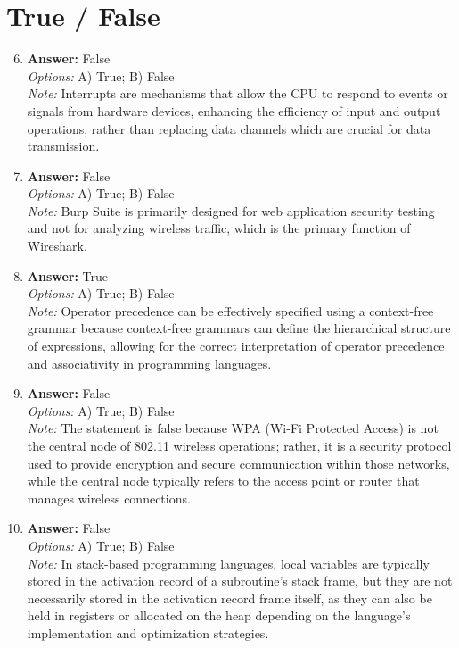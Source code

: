 \documentclass[12pt]{article}
\begin{document}
\section*{True / False}
\begin{enumerate}[label=\arabic*.]
\setcounter{enumi}{5}
\item \textbf{Answer:} False
\\ \textit{Options:} A) True; B) False
\\ \textit{Note:} Interrupts are mechanisms that allow the CPU to respond to events or signals from hardware devices, enhancing the efficiency of input and output operations, rather than replacing data channels which are crucial for data transmission.
\item \textbf{Answer:} False
\\ \textit{Options:} A) True; B) False
\\ \textit{Note:} Burp Suite is primarily designed for web application security testing and not for analyzing wireless traffic, which is the primary function of Wireshark.
\item \textbf{Answer:} True
\\ \textit{Options:} A) True; B) False
\\ \textit{Note:} Operator precedence can be effectively specified using a context-free grammar because context-free grammars can define the hierarchical structure of expressions, allowing for the correct interpretation of operator precedence and associativity in programming languages.
\item \textbf{Answer:} False
\\ \textit{Options:} A) True; B) False
\\ \textit{Note:} The statement is false because WPA (Wi-Fi Protected Access) is not the central node of 802.11 wireless operations; rather, it is a security protocol used to provide encryption and secure communication within those networks, while the central node typically refers to the access point or router that manages wireless connections.
\item \textbf{Answer:} False
\\ \textit{Options:} A) True; B) False
\\ \textit{Note:} In stack-based programming languages, local variables are typically stored in the activation record of a subroutine's stack frame, but they are not necessarily stored in the activation record frame itself, as they can also be held in registers or allocated on the heap depending on the language's implementation and optimization strategies.
\end{enumerate}
\end{document}
